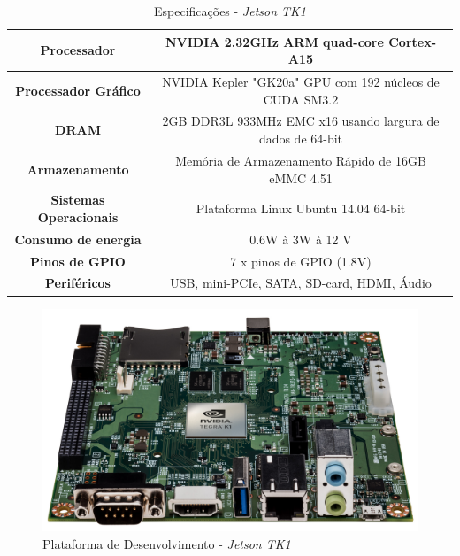 \begin{table}[]
\centering
\caption{Especificações - \textit{Jetson TK1}}
\label{jetson_tk1_tab}
\begin{tabular}{|c|c|}
\hline
\textbf{Processador}           & NVIDIA 2.32GHz ARM quad-core Cortex-A15			\\	\hline
\textbf{Processador Gráfico}   & NVIDIA Kepler "GK20a" GPU com 192 núcleos de CUDA SM3.2	\\	\hline
\textbf{DRAM}                  & 2GB DDR3L 933MHz EMC x16 usando largura de dados de 64-bit	\\	\hline
\textbf{Armazenamento}         & Memória de Armazenamento Rápido de 16GB eMMC 4.51		\\	\hline
\textbf{Sistemas Operacionais} & Plataforma Linux Ubuntu 14.04 64-bit                  		\\	\hline
\textbf{Consumo de energia}    & 0.6W à 3W à 12 V                    		\\	\hline
\textbf{Pinos de GPIO}         & 7 x pinos de GPIO (1.8V)                              		\\	\hline
\textbf{Periféricos}           & USB, mini-PCIe, SATA, SD-card, HDMI, Áudio           		\\	\hline
\end{tabular}
\end{table}

\begin{figure}[H]
	\centering
	\includegraphics[scale=0.10]{./Resources/jetson_tk1.jpg}
	\caption{Plataforma de Desenvolvimento - \textit{Jetson TK1}}
	\label{jetson_tk1}
\end{figure}


